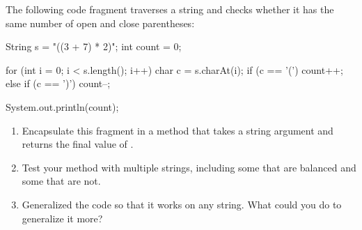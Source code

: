 \begin{exercise}  %


The following code fragment traverses a string and checks whether it has the same number of open and close parentheses:

\begin{code}
String s = "((3 + 7) * 2)";
int count = 0;

for (int i = 0; i < s.length(); i++) {
    char c = s.charAt(i);
    if (c == '(') {
        count++;
    } else if (c == ')') {
        count--;
    }
}

System.out.println(count);
\end{code}

\begin{enumerate}

\item Encapsulate this fragment in a method that takes a string argument and returns the final value of .

\item Test your method with multiple strings, including some that are balanced and some that are not.

\item Generalized the code so that it works on any string. What could you do to generalize it more?

\end{enumerate}

\end{exercise}
